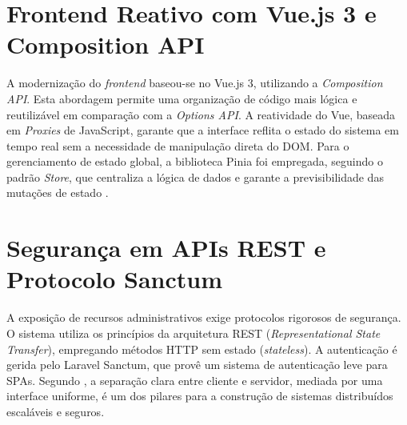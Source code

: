 \section{Frontend Reativo com Vue.js 3 e Composition API}

A modernização do \textit{frontend} baseou-se no Vue.js 3, utilizando a \textit{Composition API}. Esta abordagem permite uma organização de código mais lógica e reutilizável em comparação com a \textit{Options API}. A reatividade do Vue, baseada em \textit{Proxies} de JavaScript, garante que a interface reflita o estado do sistema em tempo real sem a necessidade de manipulação direta do DOM. Para o gerenciamento de estado global, a biblioteca Pinia foi empregada, seguindo o padrão \textit{Store}, que centraliza a lógica de dados e garante a previsibilidade das mutações de estado \cite{you2024}.

\section{Segurança em APIs REST e Protocolo Sanctum}

A exposição de recursos administrativos exige protocolos rigorosos de segurança. O sistema utiliza os princípios da arquitetura REST (\textit{Representational State Transfer}), empregando métodos HTTP sem estado (\textit{stateless}). A autenticação é gerida pelo Laravel Sanctum, que provê um sistema de autenticação leve para SPAs. Segundo , a separação clara entre cliente e servidor, mediada por uma interface uniforme, é um dos pilares para a construção de sistemas distribuídos escaláveis e seguros.
